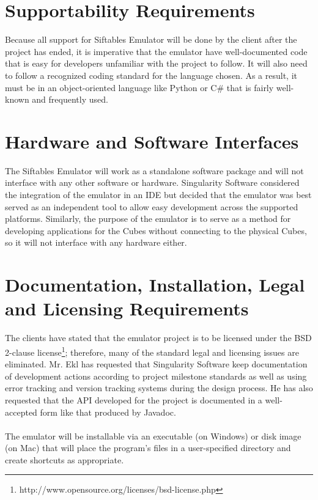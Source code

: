 \documentclass[12pt]{article}
\begin{document}
\section{Supportability Requirements}
Because all support for Siftables Emulator will be done by the client after the project has ended, it is imperative that the emulator have well-documented code that is easy for developers unfamiliar with the project to follow. It will also need to follow a recognized coding standard for the language chosen. As a result, it must be in an object-oriented language like Python or C\# that is fairly well-known and frequently used.

\section{Hardware and Software Interfaces}
The Siftables Emulator will work as a standalone software package and will not interface with any other software or hardware. Singularity Software considered the integration of the emulator in an \gls{IDE} but decided that the emulator was best served as an independent tool to allow easy development across the supported platforms. Similarly, the purpose of the emulator is to serve as a method for developing applications for the Cubes without connecting to the physical Cubes, so it will not interface with any hardware either.

\section{Documentation, Installation, Legal and Licensing Requirements}
The clients have stated that the emulator project is to be licensed under the BSD 2-clause license\footnote{http://www.opensource.org/licenses/bsd-license.php}; therefore, many of the standard legal and licensing issues are eliminated. Mr. Ekl has requested that Singularity Software keep documentation of development actions according to project milestone standards as well as using error tracking and version tracking systems during the design process. He has also requested that the API developed for the project is documented in a well-accepted form like that produced by Javadoc.\\\\
The emulator will be installable via an executable (on \gls{Windows}) or disk image (on \gls{Mac}) that will place the program's files in a user-specified directory and create shortcuts as appropriate.
\end{document}
